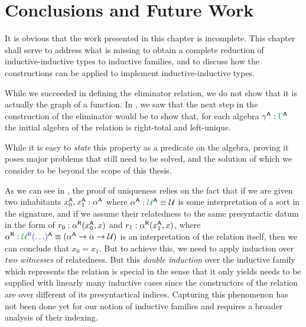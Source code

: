 \section{Conclusions and Future Work}

It is obvious that the work presented in this chapter is incomplete.
This chapter shall serve to address what is missing to obtain a complete
reduction of inductive-inductive types to inductive families,
and to discuss how the constructions can be applied to implement inductive-inductive
types.

\begin{remark}
While we succeeded in defining the eliminator relation, we do not show that it
is actually the graph of a function.
In , we saw that the next step in the construction of the
eliminator would be to show that, for each algebra $\gamma^\CC : \grm{\Gamma}^\CC$
the initial algebra of the relation
\tqm{\grm{\Gamma}^\RR(\blm{\IFcon{\grm{\Gamma}^\EE}}, \blm{\gamma^\CC})}
is right-total and left-unique.

While it is easy to \emph{state} this property as a predicate on the algebra,
proving it poses major problems that still need to be solved,
and the solution of which we consider to be beyond the scope of this thesis.

As we can see in , the proof of uniqueness
relies on the fact that if we are given two inhabitants $x^{\mathsf{A}}_0, x^{\mathsf{A}}_1 : \alpha^{\mathsf{A}}$
where $\alpha^\CC : \grm{\UU}^\CC \equiv \UU$ is some interpretation of a
sort in the signature, and if we assume their relatedness to the same presyntactic
datum in the form of $r_0 : \alpha^{\mathsf{R}}(x^{\mathsf{A}}_0, x)$ and $r_1 : \alpha^{\mathsf{R}}(x^{\mathsf{A}}_1, x)$,
where $\alpha^\RR : \tqm{\grm{\UU}^\RR(\ldots)}^\CC \equiv (\alpha^\CC \to \alpha \to \UU)$
is an interpretation of the relation itself,
then we can conclude that $x_0 = x_1$.
But to achieve this, we need to apply induction over \emph{two witnesses} of
relatedness.
But this \emph{double induction} over the inductive family which represents the
relation is special in the sense that it only yields needs to be supplied with
linearly many inductive cases
since the constructors of the relation are over different of its presyntactical
indices.
Capturing this phenomenon has not been done yet for our notion of
inductive families and
requires a broader analysis of their indexing.


\end{remark}
